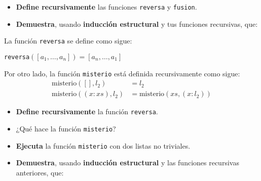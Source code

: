 \documentclass[oneside]{style}
\begin{document}
\begin{questions}[label=\protect\circled{\bfseries\arabic*}]
{        \begin{itemize}
            \item \textbf{Define recursivamente} las funciones \texttt{reversa} 
            y \texttt{fusion}.

            \item \textbf{Demuestra}, usando \textbf{inducción estructural} y 
            tus funciones recursivas, que:  
            \begin{center}
            \end{center}
        \end{itemize}
    }

    \question
    {
        La función \texttt{reversa} se define como sigue:
        \begin{center}
            \texttt{reversa}$([a_1, \ldots, a_n]) = [a_n, \ldots, a_1]$ 
        \end{center}

        Por otro lado, la función \texttt{misterio} está definida 
        recursivamente como sigue: 
        \begin{align*}
            \text{misterio}([], l_2) &= l_2 \\ 
            \text{misterio}((x:xs), l_2) &= \text{misterio}(xs, (x:l_2))
        \end{align*}

        \begin{itemize}
            \item \textbf{Define recursivamente} la función \texttt{reversa}.
            
            \item ¿Qué hace la función \texttt{misterio}?
            
            \item \textbf{Ejecuta} la función \texttt{misterio} con dos 
            listas no triviales. 

            \item \textbf{Demuestra}, usando \textbf{inducción estructural} y 
            las funciones recursivas anteriores, que:  
            \begin{center}
            \end{center}
        \end{itemize}
    }


\end{questions}
\end{document}
